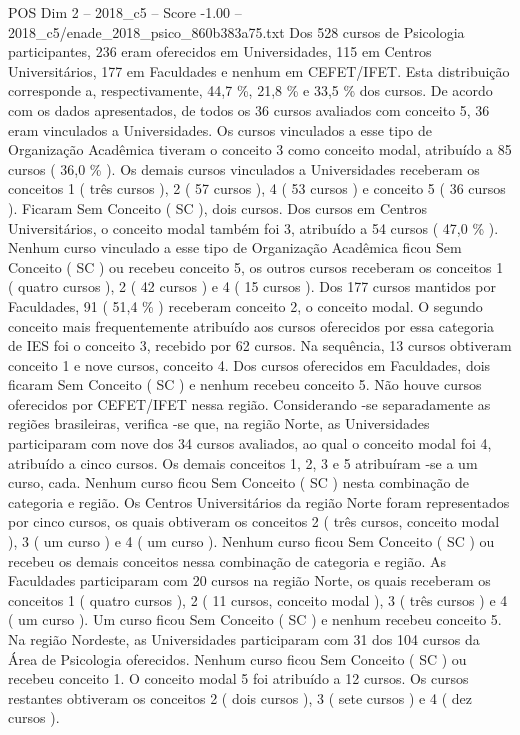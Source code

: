 \begin{textsample}{POS Dim 2 – 2018\_c5 – Score -1.00 – 2018\_c5/enade\_2018\_psico\_860b383a75.txt}
Dos 528 cursos de Psicologia participantes, 236 eram oferecidos em Universidades, 115 em Centros Universitários, 177 em Faculdades e nenhum em CEFET/IFET.
Esta distribuição corresponde a, respectivamente, 44,7 \%, 21,8 \% e 33,5 \% dos cursos.
De acordo com os dados apresentados, de todos os 36 cursos avaliados com conceito 5, 36 eram vinculados a Universidades.
Os cursos vinculados a esse tipo de Organização Acadêmica tiveram o conceito 3 como conceito modal, atribuído a 85 cursos ( 36,0 \% ).
Os demais cursos vinculados a Universidades receberam os conceitos 1 ( três cursos ), 2 ( 57 cursos ), 4 ( 53 cursos ) e conceito 5 ( 36 cursos ).
Ficaram Sem Conceito ( SC ), dois cursos.
Dos cursos em Centros Universitários, o conceito modal também foi 3, atribuído a 54 cursos ( 47,0 \% ).
Nenhum curso vinculado a esse tipo de Organização Acadêmica ficou Sem Conceito ( SC ) ou recebeu conceito 5, os outros cursos receberam os conceitos 1 ( quatro cursos ), 2 ( 42 cursos ) e 4 ( 15 cursos ).
Dos 177 cursos mantidos por Faculdades, 91 ( 51,4 \% ) receberam conceito 2, o conceito modal.
O segundo conceito mais frequentemente atribuído aos cursos oferecidos por essa categoria de IES foi o conceito 3, recebido por 62 cursos.
Na sequência, 13 cursos obtiveram conceito 1 e nove cursos, conceito 4.
Dos cursos oferecidos em Faculdades, dois ficaram Sem Conceito ( SC ) e nenhum recebeu conceito 5.
Não houve cursos oferecidos por CEFET/IFET nessa região.
Considerando -se separadamente as regiões brasileiras, verifica -se que, na região Norte, as Universidades participaram com nove dos 34 cursos avaliados, ao qual o conceito modal foi 4, atribuído a cinco cursos.
Os demais conceitos 1, 2, 3 e 5 atribuíram -se a um curso, cada.
Nenhum curso ficou Sem Conceito ( SC ) nesta combinação de categoria e região.
Os Centros Universitários da região Norte foram representados por cinco cursos, os quais obtiveram os conceitos 2 ( três cursos, conceito modal ), 3 ( um curso ) e 4 ( um curso ).
Nenhum curso ficou Sem Conceito ( SC ) ou recebeu os demais conceitos nessa combinação de categoria e região.
As Faculdades participaram com 20 cursos na região Norte, os quais receberam os conceitos 1 ( quatro cursos ), 2 ( 11 cursos, conceito modal ), 3 ( três cursos ) e 4 ( um curso ).
Um curso ficou Sem Conceito ( SC ) e nenhum recebeu conceito 5.
Na região Nordeste, as Universidades participaram com 31 dos 104 cursos da Área de Psicologia oferecidos.
Nenhum curso ficou Sem Conceito ( SC ) ou recebeu conceito 1.
O conceito modal 5 foi atribuído a 12 cursos.
Os cursos restantes obtiveram os conceitos 2 ( dois cursos ), 3 ( sete cursos ) e 4 ( dez cursos ).

\end{textsample}
